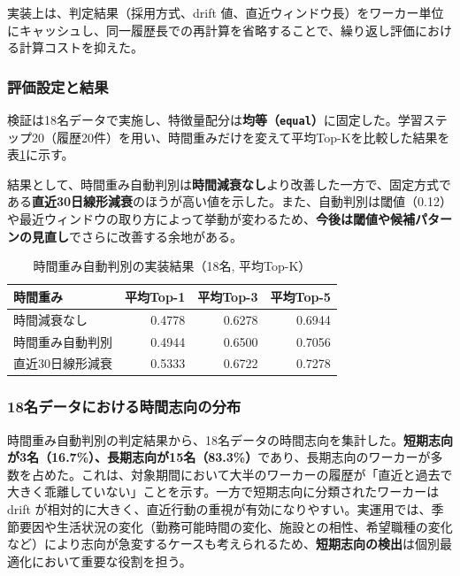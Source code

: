 実装上は、判定結果（採用方式、drift 値、直近ウィンドウ長）をワーカー単位にキャッシュし、同一履歴長での再計算を省略することで、繰り返し評価における計算コストを抑えた。

\subsubsection*{評価設定と結果}
検証は18名データで実施し、特徴量配分は\textbf{均等（\texttt{equal}）}に固定した。学習ステップ20（履歴20件）を用い、時間重みだけを変えて平均Top-Kを比較した結果を表\ref{tab:time-auto-results}に示す。

結果として、時間重み自動判別は\textbf{時間減衰なし}より改善した一方で、固定方式である\textbf{直近30日線形減衰}のほうが高い値を示した。また、自動判別は閾値（0.12）や最近ウィンドウの取り方によって挙動が変わるため、\textbf{今後は閾値や候補パターンの見直し}でさらに改善する余地がある。

\begin{table}[htbp]
\centering
\caption{時間重み自動判別の実装結果（18名, 平均Top-K）}
\label{tab:time-auto-results}
\scriptsize
\begin{tabular}{l r r r}
\hline
時間重み & 平均Top-1 & 平均Top-3 & 平均Top-5 \\
\hline
時間減衰なし & 0.4778 & 0.6278 & 0.6944 \\
時間重み自動判別 & 0.4944 & 0.6500 & 0.7056 \\
直近30日線形減衰 & 0.5333 & 0.6722 & 0.7278 \\
\hline
\end{tabular}
\end{table}

\subsubsection*{18名データにおける時間志向の分布}
時間重み自動判別の判定結果から、18名データの時間志向を集計した。\textbf{短期志向が3名（16.7\%）、長期志向が15名（83.3\%）}であり、長期志向のワーカーが多数を占めた。これは、対象期間において大半のワーカーの履歴が「直近と過去で大きく乖離していない」ことを示す。一方で短期志向に分類されたワーカーは drift が相対的に大きく、直近行動の重視が有効になりやすい。実運用では、季節要因や生活状況の変化（勤務可能時間の変化、施設との相性、希望職種の変化など）により志向が急変するケースも考えられるため、\textbf{短期志向の検出}は個別最適化において重要な役割を担う。
